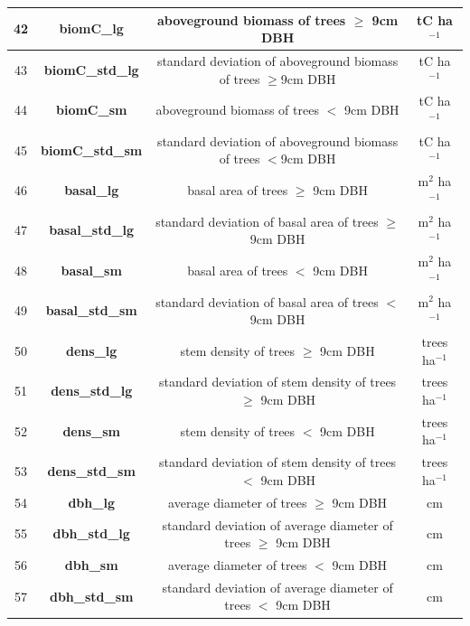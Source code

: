 \documentclass[a4paper, 12pt] {article}
\begin{document}
\begin{table} [H]
{\begin{tabular}{|c|c|c|c|}
\hline 
42 & \textbf{biomC\_lg} & aboveground biomass of trees $\geq$ 9cm DBH & tC ha$^{-1}$ \\
\hline 
43 & \textbf{biomC\_std\_lg} & standard deviation of aboveground biomass of trees $\geq$9cm DBH & tC ha$^{-1}$ \\
\hline 
44 & \textbf{biomC\_sm} & aboveground biomass of trees $<$ 9cm DBH & tC ha$^{-1}$ \\
\hline 
45 & \textbf{biomC\_std\_sm} & standard deviation of aboveground biomass of trees $<$9cm DBH & tC ha$^{-1}$ \\
\hline 
46 & \textbf{basal\_lg} & basal area of trees $\geq$ 9cm DBH & m$^2$ ha$^{-1}$ \\
\hline 
47 & \textbf{basal\_std\_lg} & standard deviation of basal area of trees $\geq$ 9cm DBH & m$^2$  ha$^{-1}$ \\
\hline 
48 & \textbf{basal\_sm} & basal area of trees $<$ 9cm DBH & m$^2$  ha$^{-1}$ \\
\hline 
49 & \textbf{basal\_std\_sm} & standard deviation of basal area of trees $<$9cm DBH & m$^2$  ha$^{-1}$ \\
\hline 
50 & \textbf{dens\_lg} & stem density of trees $\geq$ 9cm DBH & trees ha$^{-1}$ \\
\hline 
51 & \textbf{dens\_std\_lg} & standard deviation of stem density of trees $\geq$ 9cm DBH & trees  ha$^{-1}$ \\
\hline 
52 & \textbf{dens\_sm} & stem density of trees $<$ 9cm DBH & trees ha$^{-1}$ \\
\hline 
53 & \textbf{dens\_std\_sm} & standard deviation of stem density of trees $<$ 9cm DBH & trees ha$^{-1}$ \\
\hline 
54 & \textbf{dbh\_lg} & average diameter of trees $\geq$ 9cm DBH & cm \\
\hline 
55 & \textbf{dbh\_std\_lg} & standard deviation of average diameter of trees $\geq$ 9cm DBH & cm \\
\hline 
56 & \textbf{dbh\_sm} & average diameter of trees $<$ 9cm DBH & cm \\
\hline 
57 & \textbf{dbh\_std\_sm} & standard deviation of average diameter of trees $<$ 9cm DBH & cm \\
\hline 
\hline 
\end{tabular}}
\end{table}
\end{document}

